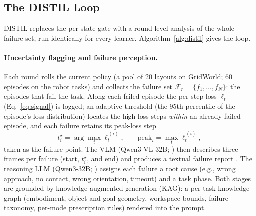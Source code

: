 \documentclass[letterpaper]{article} %
\begin{document}
\subsection{The DISTIL Loop}
\label{sec:distil}

DISTIL replaces the per-state gate with a round-level analysis of the whole
failure set, run identically for every learner.
Algorithm~\ref{alg:distil} gives the loop.

\paragraph{Uncertainty flagging and failure perception.}
Each round rolls the current policy (a pool of 20 layouts on GridWorld; 60
episodes on the robot tasks) and collects the failure set
$\mathcal{F}_r=\{f_1,\dots,f_N\}$: the episodes that fail the task. Along
each failed episode the per-step loss $\ell_t$ (Eq.~\ref{eq:signal}) is
logged; an adaptive threshold (the 95th percentile of the episode's loss
distribution) locates the high-loss steps \emph{within} an already-failed
episode, and each failure retains its peak-loss step
\begin{equation}
t^\star_i=\arg\max_t \ell^{\,(i)}_t,
\qquad
\mathrm{peak}_i=\max_t \ell^{\,(i)}_t,
\label{eq:flag}
\end{equation}
taken as the failure point. The
VLM (Qwen3-VL-32B; \citealp{bai2025qwen3vl}) then describes three frames per
failure (start, $t^\star_i$, and end) and produces a textual failure report
\citep{liu2023reflect,duan2025aha}. The reasoning LLM (Qwen3-32B;
\citealp{yang2025qwen3}) assigns each failure a root cause (e.g., wrong
approach, no contact, wrong orientation, timeout) and a task phase. Both
stages are grounded by knowledge-augmented generation (KAG): a per-task
knowledge graph (embodiment, object and goal geometry, workspace bounds,
failure taxonomy, per-mode prescription rules) rendered into the prompt.
\end{document}
